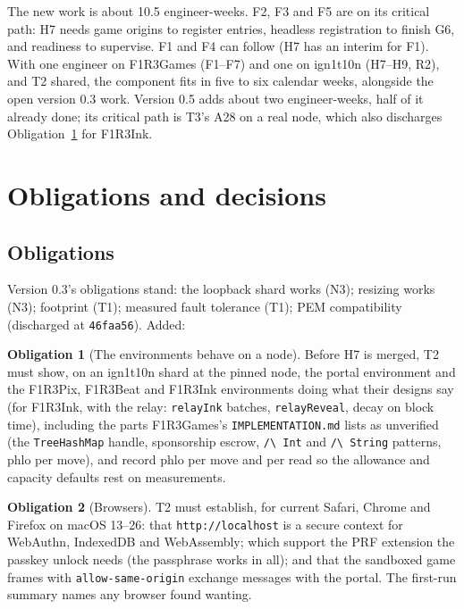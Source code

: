 \documentclass[11pt]{article}
\theoremstyle{definition}
\newtheorem{obligation}{Obligation}
\theoremstyle{remark}
\newcommand{\code}[1]{\texttt{#1}}
\newcommand{\Hr}{ign1t10n}
\newcommand{\Gm}{F1R3Games}
\begin{document}
\noindent
The new work is about 10.5 engineer-weeks. F2, F3 and F5 are on its critical path:
H7 needs game origins to register entries, headless registration to finish G6, and
readiness to supervise. F1 and F4 can follow (H7 has an interim for F1). With one
engineer on \Gm{} (F1--F7) and one on \Hr{} (H7--H9, R2), and T2 shared, the
component fits in five to six calendar weeks, alongside the open version 0.3 work.
Version 0.5 adds about two engineer-weeks, half of it already done; its critical path
is T3's A28 on a real node, which also discharges Obligation~\ref{ob:envs} for F1R3Ink.

\section{Obligations and decisions}\label{sec:open}

\subsection{Obligations}

Version 0.3's obligations stand: the loopback shard works (N3); resizing works (N3);
footprint (T1); measured fault tolerance (T1); PEM compatibility (discharged at
\code{46faa56}). Added:

\begin{obligation}[The environments behave on a node]\label{ob:envs}
Before H7 is merged, T2 must show, on an \Hr{} shard at the pinned node, the portal
environment and the F1R3Pix, F1R3Beat and F1R3Ink environments doing what their designs say
(for F1R3Ink, with the relay: \code{relayInk} batches, \code{relayReveal}, decay on block time),
including the parts \Gm{}'s \code{IMPLEMENTATION.md} lists as unverified (the
\code{TreeHashMap} handle, sponsorship escrow, \code{/\textbackslash\ Int} and
\code{/\textbackslash\ String} patterns, phlo per move), and record phlo per move and
per read so the allowance and capacity defaults rest on measurements.
\end{obligation}

\begin{obligation}[Browsers]\label{ob:browsers}
T2 must establish, for current Safari, Chrome and Firefox on macOS 13--26: that
\code{http://localhost} is a secure context for WebAuthn, IndexedDB and WebAssembly;
which support the PRF extension the passkey unlock needs (the passphrase works in
all); and that the sandboxed game frames with \code{allow-same-origin} exchange
messages with the portal. The first-run summary names any browser found wanting.
\end{obligation}
\end{document}

